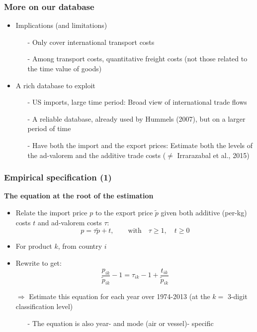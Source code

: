 \documentclass[10 pt,Helvetica, french]{beamer}
\begin{document}
\begin{frame}
\frametitle{More on our database}
\begin{itemize}
\item Implications (and limitations) \vspace{0.1cm}
\begin{itemize}
\item[-] Only cover international transport costs \vspace{0.1cm}
\item[-] Among transport costs, quantitative freight costs (not those related to the time value of goods) \vspace{0.1cm}
\end{itemize}
\item A rich database to exploit \vspace{0.1cm}
\begin{itemize}
\item[-] US imports, large time period: Broad view of international trade flows \vspace{0.1cm}
\item[-] A reliable database, already used by Hummels (2007), but on a larger period of time \vspace{0.1cm}
\item[-] Have both the import and the export prices: Estimate both the levels of the ad-valorem and the additive trade costs ($\neq$ Irrarazabal et al., 2015)
\end{itemize}
\end{itemize}
\end{frame}

\begin{frame}
\frametitle{Empirical specification (1)}
\textbf{The equation at the root of the estimation}
\begin{itemize}
\item Relate the import price $p$ to the export price $\widetilde{p}$ given both additive (per-kg) costs $t$ and ad-valorem costs $\tau$:
$$p = \tau \widetilde{p} + t, \qquad \text{with}\quad \tau \geq 1,\quad t \geq 0$$
\item For product $k$, from country $i$  \vspace{0.1cm}
\item Rewrite to get:
$$\frac{p_{ik}}{\widetilde{p}_{ik}} -1 = \tau_{ik} -1 +\frac{t_{ik}}{ \widetilde{p}_{ik}}$$
\item[$\Rightarrow$] Estimate this equation for each year over 1974-2013 (at the $k=$ 3-digit classification level) \vspace{0.1cm}
\begin{itemize}
\item[-] The equation is also year- and mode (air or vessel)- specific
\end{itemize}
\end{itemize}
\end{frame}
\end{document}
